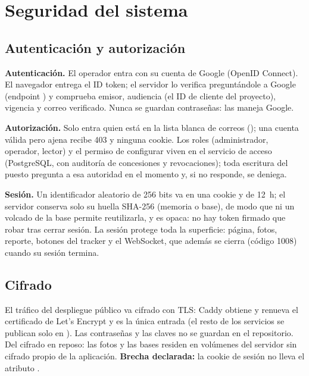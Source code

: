 \chapter{Seguridad del sistema}\label{chap:seguridad}

\section{Autenticación y autorización}
\textbf{Autenticación.} El operador entra con su cuenta de Google (OpenID Connect). El navegador entrega el ID token; el servidor lo verifica
preguntándole a Google (endpoint ) y comprueba emisor, audiencia (el ID de cliente del proyecto), vigencia y correo verificado.
Nunca se guardan contraseñas: las maneja Google.

\textbf{Autorización.} Solo entra quien está en la lista blanca de correos (); una cuenta válida pero ajena recibe
403 y ninguna cookie. Los roles (administrador, operador, lector) y el permiso de configurar viven en el servicio de acceso (PostgreSQL, con
auditoría de concesiones y revocaciones); toda escritura del puesto pregunta a esa autoridad en el momento y, si no responde, se deniega.

\textbf{Sesión.} Un identificador aleatorio de 256 bits va en una cookie  y  de 12~h; el servidor
conserva solo su huella SHA-256 (memoria o base), de modo que ni un volcado de la base permite reutilizarla, y es opaca: no hay token firmado
que robar tras cerrar sesión. La sesión protege toda la superficie: página, fotos, reporte, botones del tracker y el WebSocket, que además se
cierra (código 1008) cuando su sesión termina.

\section{Cifrado}
El tráfico del despliegue público va cifrado con TLS: Caddy obtiene y renueva el certificado de Let's Encrypt y es la única entrada
(el resto de los servicios se publican solo en ). Las contraseñas y las claves no se guardan en el repositorio. Del cifrado en
reposo: las fotos y las bases residen en volúmenes del servidor sin cifrado propio de la aplicación. \textbf{Brecha declarada:} la cookie
de sesión no lleva el atributo .

